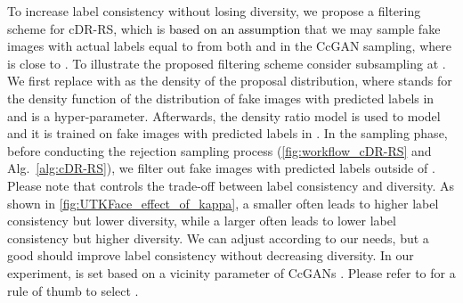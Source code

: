 \documentclass[final,12pt, 3p,times]{elsarticle}
\def\rev#1{\textcolor{black}{#1}}
\begin{document}
To increase label consistency without losing diversity, we propose a filtering scheme for cDR-RS, which is \rev{based on an assumption} that we may sample fake images with actual labels equal to  from both  and  in the CcGAN sampling, where  is close to . To illustrate the proposed filtering scheme consider subsampling at . We first replace  with  as the density of the proposal distribution, where  stands for the density function of the distribution of fake images with predicted labels in  and  is a hyper-parameter. Afterwards, the density ratio model  is used to model  and it is trained on fake images with predicted labels in . In the sampling phase, before conducting the rejection sampling process (\cref{fig:workflow_cDR-RS} and Alg.\ \ref{alg:cDR-RS}), we filter out fake images with predicted labels outside of . Please note that  controls the trade-off between label consistency and diversity. As shown in \cref{fig:UTKFace_effect_of_kappa}, a smaller  often leads to higher label consistency but lower diversity, while a larger  often leads to lower label consistency but higher diversity. We can adjust  according to our needs, but a good  should improve label consistency without decreasing diversity. In our experiment,  is set based on a vicinity parameter  of CcGANs \cite{ding2021ccgan, ding2020continuous}. Please refer to  for a rule of thumb to select .
\end{document}
